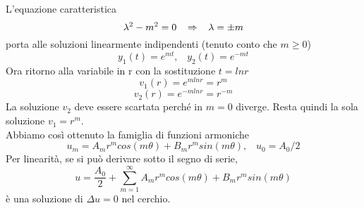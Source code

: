 L'equazione caratteristica
\[
	\lambda^2 - m^2=0 \;\;\; \Rightarrow \;\;\; \lambda= \pm m
\]
porta alle soluzioni linearmente indipendenti (tenuto conto che $m\geq 0$)
\[
	y_1(t)= e^{mt}, \;\;\; y_2(t)= e^{-mt}
\]
Ora ritorno alla variabile in r con la sostituzione $t= ln r$
\[
	v_1(r)= e^{m lnr}= r^m
\]
\[
	v_2(r)= e^{-m lnr}= r^{-m}
\]
La soluzione $v_2$ deve essere scartata perch\'e in $m=0$ diverge.
Resta quindi la sola soluzione $v_1=r^m$.\\
Abbiamo cos\`i ottenuto la famiglia di funzioni armoniche
\[
	u_m= A_m r^m cos(m \theta)+ B_m r^m sin (m \theta), \;\;\; u_0= A_0/2
\]
Per linearit\`a, se si pu\`o derivare sotto il segno di serie,
\[
	u= \frac{A_0}{2} + \sum_{m=1}^{\infty}
	A_m r^m cos(m \theta)+ B_m r^m sin (m \theta)
\]
\`e una soluzione di $\Delta u=0$ nel cerchio.
